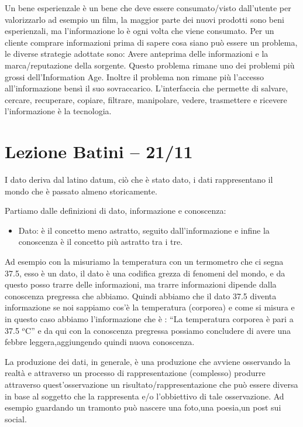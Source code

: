 \documentclass[a4page, 11pt]{article}
\begin{document}
Un bene esperienzale è un bene che deve essere consumato/visto
dall'utente per valorizzarlo ad esempio un film, la maggior parte dei
nuovi prodotti sono beni esperienzali, ma l'informazione lo è ogni volta
che viene consumato. Per un cliente comprare informazioni prima di
sapere cosa siano può essere un problema, le diverse strategie adottate
sono: Avere anteprima delle informazioni e la marca/reputazione della
sorgente. Questo problema rimane uno dei problemi più grossi
dell'Information Age. Inoltre il problema non rimane più l'accesso
all'informazione bensì il suo sovraccarico. L'interfaccia che permette
di salvare, cercare, recuperare, copiare, filtrare, manipolare, vedere,
trasmettere e ricevere l'informazione è la tecnologia.

\section*{Lezione Batini -- 21/11}

I dato deriva dal latino datum, ciò che è stato dato, i dati
rappresentano il mondo che è passato almeno storicamente.

Partiamo dalle definizioni di dato, informazione e conoscenza:

\begin{itemize}
	 
	\item
	Dato: è il concetto meno astratto, seguito dall'informazione e infine
	la conoscenza è il concetto più astratto tra i tre. 
\end{itemize}

Ad esempio con la misuriamo la temperatura con un termometro che ci
segna 37.5, esso è un dato, il dato è una codifica grezza di fenomeni del mondo, e
da questo posso trarre delle informazioni, ma trarre informazioni
dipende dalla conoscenza pregressa che abbiamo. Quindi abbiamo che il dato 37.5
diventa informazione se noi sappiamo cos'è la temperatura (corporea) e
come si misura e in questo caso abbiamo l'informazione che è : ``La
temperatura corporea è pari a 37.5 $^o$C'' e da qui con la conoscenza
pregressa possiamo concludere di avere una febbre leggera,aggiungendo quindi 
nuova conoscenza.

La produzione dei dati, in generale, è una produzione che avviene
osservando la realtà e attraverso un processo di rappresentazione
(complesso) produrre attraverso quest'osservazione un
risultato/rappresentazione che può essere diversa in base al soggetto
che la rappresenta e/o l'obbiettivo di tale osservazione.
Ad esempio guardando un tramonto può nascere una foto,una poesia,un post sui social.
\end{document}
